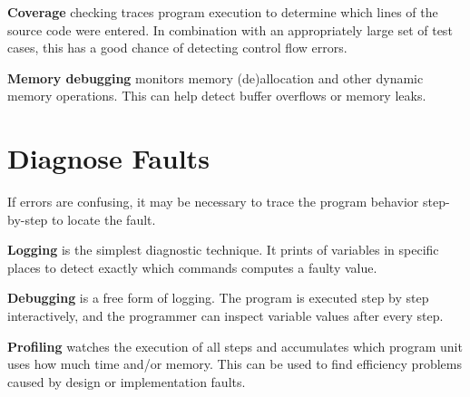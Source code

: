 \textbf{Coverage} checking traces program execution to determine which lines of the source code were entered.
In combination with an appropriately large set of test cases, this has a good chance of detecting control flow errors. 
\medskip

\textbf{Memory debugging} monitors memory (de)allocation and other dynamic memory operations.
This can help detect buffer overflows or memory leaks.

\section{Diagnose Faults}

If errors are confusing, it may be necessary to trace the program behavior step-by-step to locate the fault.

\textbf{Logging} is the simplest diagnostic technique. It prints of variables in specific places to detect exactly which commands computes a faulty value.

\textbf{Debugging} is a free form of logging. The program is executed step by step interactively, and the programmer can inspect variable values after every step.

\textbf{Profiling} watches the execution of all steps and accumulates which program unit uses how much time and/or memory.
 This can be used to find efficiency problems caused by design or implementation faults.


